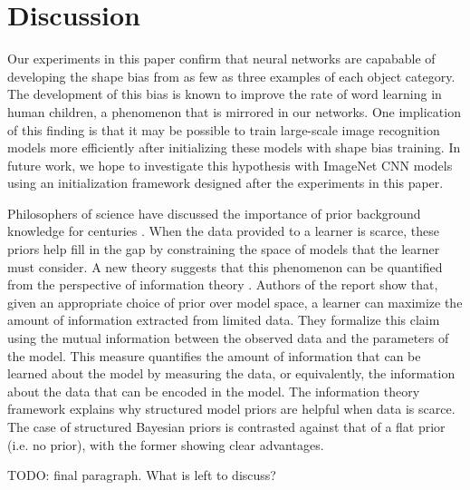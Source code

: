 \section{Discussion}
Our experiments in this paper confirm that neural networks are capabable
of developing the shape bias from as few as three examples of each object category.
The development of this bias is known to improve the rate of word learning in
human children, a phenomenon that is mirrored in our networks. One implication
of this finding is that it may be possible to train
large-scale image recognition models more efficiently after initializing these
models with shape bias training. In future work, we hope to investigate this
hypothesis with ImageNet CNN models using an initialization framework designed
after the experiments in this paper.

Philosophers of science have discussed the importance of prior background knowledge
for centuries \citep{Tenenbaum2011}. When the data provided to a learner is scarce, these
priors help fill in the gap by constraining the space of models that the learner
must consider. A new theory suggests that this phenomenon can be
quantified from the perspective of information theory \citep{Mattingly2017}.
Authors of the report show that, given an appropriate choice of prior over model
space, a learner can maximize the amount of information extracted from limited
data. They formalize this claim using the mutual information between the
observed data and the parameters of the model. This measure quantifies the amount
of information that can be learned about the model by measuring the data, or
equivalently, the information about the data that can be encoded in the model.
The information theory framework explains why structured model priors are
helpful when data is scarce. The case of structured Bayesian priors is contrasted
against that of a flat prior (i.e. no prior), with the former showing clear
advantages.

TODO: final paragraph. What is left to discuss?